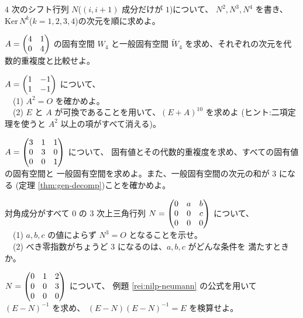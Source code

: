 \begin{mondai}[基本]\label{q:nilp-ex3}
$4$ 次のシフト行列 $N$($(i, i+1)$ 成分だけが $1$)について、
$N^2, N^3, N^4$ を書き、
$\mathrm{Ker}\,N^k$($k = 1, 2, 3, 4$)の次元を順に求めよ。
\end{mondai}

\begin{mondai}[基本]\label{q:nilp-ex4}
$A = \begin{pmatrix}4 & 1 \\ 0 & 4\end{pmatrix}$ の固有空間 $W_4$ と一般固有空間
$\widetilde{W}_4$ を求め、それぞれの次元を代数的重複度と比較せよ。
\end{mondai}

\begin{mondai}[標準]\label{q:nilp-ex5}
$A = \begin{pmatrix}1 & -1 \\ 1 & -1\end{pmatrix}$ について、\\
　(1) $A^2 = O$ を確かめよ。\\
　(2) $E$ と $A$ が可換であることを用いて、$(E + A)^{10}$ を求めよ
(ヒント:二項定理を使うと $A^2$ 以上の項がすべて消える)。
\end{mondai}

\begin{mondai}[標準]\label{q:nilp-ex6}
$A = \begin{pmatrix}3 & 1 & 1 \\ 0 & 3 & 0 \\ 0 & 0 & 1\end{pmatrix}$ について、
固有値とその代数的重複度を求め、すべての固有値の固有空間と
一般固有空間を求めよ。また、一般固有空間の次元の和が $3$ になる
(定理 \ref{thm:gen-decomp})ことを確かめよ。
\end{mondai}

\begin{mondai}[標準]\label{q:nilp-ex7}
対角成分がすべて $0$ の $3$ 次上三角行列
$N = \begin{pmatrix}0 & a & b \\ 0 & 0 & c \\ 0 & 0 & 0\end{pmatrix}$ について、\\
　(1) $a, b, c$ の値によらず $N^3 = O$ となることを示せ。\\
　(2) べき零指数がちょうど $3$ になるのは、$a, b, c$ がどんな条件を
満たすときか。
\end{mondai}

\begin{mondai}[標準]\label{q:nilp-ex8}
$N = \begin{pmatrix}0 & 1 & 2 \\ 0 & 0 & 3 \\ 0 & 0 & 0\end{pmatrix}$ について、
例題 \ref{rei:nilp-neumann} の公式を用いて $(E - N)^{-1}$ を求め、
$(E - N)(E - N)^{-1} = E$ を検算せよ。
\end{mondai}

